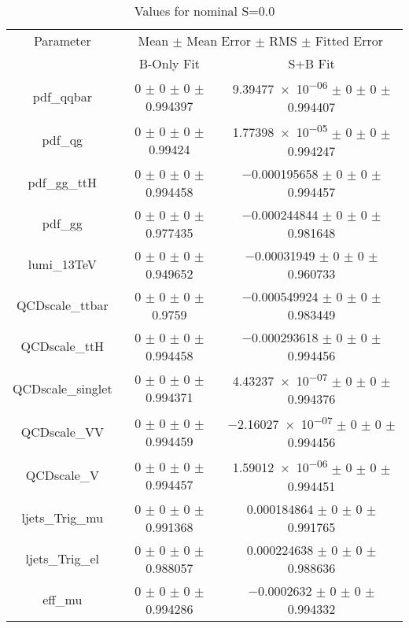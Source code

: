 \begin{table}
\centering
\caption{Values for nominal S=0.0}
\begin{tabular}{ccc}
\toprule
Parameter & \multicolumn{2}{c}{Mean $\pm$ Mean Error $\pm$ RMS $\pm$ Fitted Error}\\
 & B-Only Fit & S+B Fit\\
\midrule
pdf\_qqbar & \num{0} $\pm$ \num{0} $\pm$ \num{0} $\pm$ \num{0.994397} & \num{9.39477e-06} $\pm$ \num{0} $\pm$ \num{0} $\pm$ \num{0.994407}\\
pdf\_qg & \num{0} $\pm$ \num{0} $\pm$ \num{0} $\pm$ \num{0.99424} & \num{1.77398e-05} $\pm$ \num{0} $\pm$ \num{0} $\pm$ \num{0.994247}\\
pdf\_gg\_ttH & \num{0} $\pm$ \num{0} $\pm$ \num{0} $\pm$ \num{0.994458} & \num{-0.000195658} $\pm$ \num{0} $\pm$ \num{0} $\pm$ \num{0.994457}\\
pdf\_gg & \num{0} $\pm$ \num{0} $\pm$ \num{0} $\pm$ \num{0.977435} & \num{-0.000244844} $\pm$ \num{0} $\pm$ \num{0} $\pm$ \num{0.981648}\\
lumi\_13TeV & \num{0} $\pm$ \num{0} $\pm$ \num{0} $\pm$ \num{0.949652} & \num{-0.00031949} $\pm$ \num{0} $\pm$ \num{0} $\pm$ \num{0.960733}\\
QCDscale\_ttbar & \num{0} $\pm$ \num{0} $\pm$ \num{0} $\pm$ \num{0.9759} & \num{-0.000549924} $\pm$ \num{0} $\pm$ \num{0} $\pm$ \num{0.983449}\\
QCDscale\_ttH & \num{0} $\pm$ \num{0} $\pm$ \num{0} $\pm$ \num{0.994458} & \num{-0.000293618} $\pm$ \num{0} $\pm$ \num{0} $\pm$ \num{0.994456}\\
QCDscale\_singlet & \num{0} $\pm$ \num{0} $\pm$ \num{0} $\pm$ \num{0.994371} & \num{4.43237e-07} $\pm$ \num{0} $\pm$ \num{0} $\pm$ \num{0.994376}\\
QCDscale\_VV & \num{0} $\pm$ \num{0} $\pm$ \num{0} $\pm$ \num{0.994459} & \num{-2.16027e-07} $\pm$ \num{0} $\pm$ \num{0} $\pm$ \num{0.994456}\\
QCDscale\_V & \num{0} $\pm$ \num{0} $\pm$ \num{0} $\pm$ \num{0.994457} & \num{1.59012e-06} $\pm$ \num{0} $\pm$ \num{0} $\pm$ \num{0.994451}\\
ljets\_Trig\_mu & \num{0} $\pm$ \num{0} $\pm$ \num{0} $\pm$ \num{0.991368} & \num{0.000184864} $\pm$ \num{0} $\pm$ \num{0} $\pm$ \num{0.991765}\\
ljets\_Trig\_el & \num{0} $\pm$ \num{0} $\pm$ \num{0} $\pm$ \num{0.988057} & \num{0.000224638} $\pm$ \num{0} $\pm$ \num{0} $\pm$ \num{0.988636}\\
eff\_mu & \num{0} $\pm$ \num{0} $\pm$ \num{0} $\pm$ \num{0.994286} & \num{-0.0002632} $\pm$ \num{0} $\pm$ \num{0} $\pm$ \num{0.994332}\\

\end{tabular}
\end{table}
